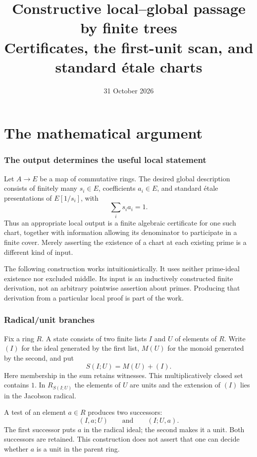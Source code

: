 \documentclass[11pt]{article}
\title{Constructive local--global passage by finite trees\\
\large Certificates, the first-unit scan, and standard \'etale charts}
\author{}
\date{31 October 2026}
\begin{document}
\maketitle

\part{The mathematical argument}

\section{The output determines the useful local statement}

Let $A\to E$ be a map of commutative rings. The desired global
description consists of finitely many $s_i\in E$, coefficients $a_i\in E$,
and standard \'etale presentations of $E[1/s_i]$, with
\[
                 \sum_i s_i a_i=1.
\]
Thus an appropriate local output is a finite algebraic certificate for
one such chart, together with information allowing its denominator to
participate in a finite cover. Merely asserting the existence of a chart
at each existing prime is a different kind of input.

The following construction works intuitionistically. It uses neither
prime-ideal existence nor excluded middle. Its input is an inductively
constructed finite derivation, not an arbitrary pointwise assertion
about primes. Producing that derivation from a particular local proof
is part of the work.

\section{Radical/unit branches}

Fix a ring $R$. A state consists of two finite lists $I$ and $U$ of
elements of $R$. Write $(I)$ for the ideal generated by the first list,
$M(U)$ for the monoid generated by the second, and put
\[
               S(I;U)=M(U)+(I).
\]
Here membership in the sum retains witnesses. This multiplicatively
closed set contains $1$. In $R_{S(I;U)}$ the elements of $U$ are units
and the extension of $(I)$ lies in the Jacobson radical.

A test of an element $a\in R$ produces two successors:
\[
          (I,a;U)\qquad\text{and}\qquad(I;U,a).
\]
The first successor puts $a$ in the radical ideal; the second makes it
a unit. Both successors are retained. This construction does not assert
that one can decide whether $a$ is a unit in the parent ring.
\end{document}
